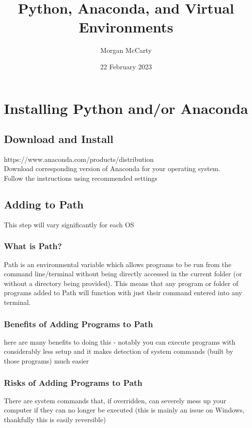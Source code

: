 \documentclass[12pt]{article}
\title{Python, Anaconda, and Virtual Environments}
\author{Morgan McCarty}
\date{22 February 2023}
\begin{document}
    \maketitle

    \section{Installing Python and/or Anaconda}

        \subsection{Download and Install}
            https://www.anaconda.com/products/distribution \\Download corresponding version of Anaconda for your operating system.
            \\Follow the instructions using recommended settings

        \subsection{Adding to Path}
            This step will vary significantly for each OS

            \subsubsection{What is Path?}
                Path is an environmental variable which allows programs to be run from the command line/terminal without being directly accessed in the current folder (or without a directory being provided).
                This means that any program or folder of programs added to Path will function with just their command entered into any terminal.
            
            \subsubsection{Benefits of Adding Programs to Path}
                here are many benefits to doing this - notably you can execute programs with considerably less setup and it makes detection of system commands
                (built by those programs) much easier

            \subsubsection{Risks of Adding Programs to Path}
                There are system commands that, if overridden, can severely mess up your computer if they can no longer be executed 
                (this is mainly an issue on Windows, thankfully this is easily reversible)
\end{document}
